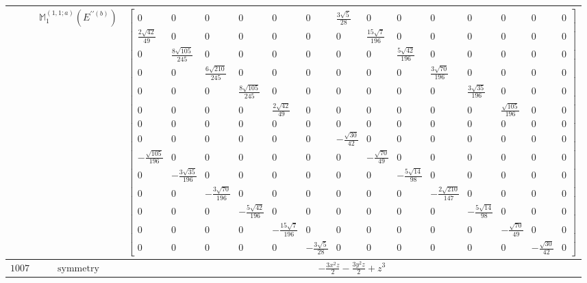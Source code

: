 \documentclass[fleqn,8pt,landscape]{jsarticle}
\begin{document}
\begin{longtable}{ccc}
$  $ & $ \mathbb{M}_{1}^{(1,1;a)}(E^{\prime\prime(b)}) $ & $ \begin{bmatrix} 0 & 0 & 0 & 0 & 0 & 0 & \frac{3 \sqrt{5}}{28} & 0 & 0 & 0 & 0 & 0 & 0 & 0 \\ \frac{2 \sqrt{42}}{49} & 0 & 0 & 0 & 0 & 0 & 0 & \frac{15 \sqrt{7}}{196} & 0 & 0 & 0 & 0 & 0 & 0 \\ 0 & \frac{8 \sqrt{105}}{245} & 0 & 0 & 0 & 0 & 0 & 0 & \frac{5 \sqrt{42}}{196} & 0 & 0 & 0 & 0 & 0 \\ 0 & 0 & \frac{6 \sqrt{210}}{245} & 0 & 0 & 0 & 0 & 0 & 0 & \frac{3 \sqrt{70}}{196} & 0 & 0 & 0 & 0 \\ 0 & 0 & 0 & \frac{8 \sqrt{105}}{245} & 0 & 0 & 0 & 0 & 0 & 0 & \frac{3 \sqrt{35}}{196} & 0 & 0 & 0 \\ 0 & 0 & 0 & 0 & \frac{2 \sqrt{42}}{49} & 0 & 0 & 0 & 0 & 0 & 0 & \frac{\sqrt{105}}{196} & 0 & 0 \\ 0 & 0 & 0 & 0 & 0 & 0 & 0 & 0 & 0 & 0 & 0 & 0 & 0 & 0 \\ 0 & 0 & 0 & 0 & 0 & 0 & - \frac{\sqrt{30}}{42} & 0 & 0 & 0 & 0 & 0 & 0 & 0 \\ - \frac{\sqrt{105}}{196} & 0 & 0 & 0 & 0 & 0 & 0 & - \frac{\sqrt{70}}{49} & 0 & 0 & 0 & 0 & 0 & 0 \\ 0 & - \frac{3 \sqrt{35}}{196} & 0 & 0 & 0 & 0 & 0 & 0 & - \frac{5 \sqrt{14}}{98} & 0 & 0 & 0 & 0 & 0 \\ 0 & 0 & - \frac{3 \sqrt{70}}{196} & 0 & 0 & 0 & 0 & 0 & 0 & - \frac{2 \sqrt{210}}{147} & 0 & 0 & 0 & 0 \\ 0 & 0 & 0 & - \frac{5 \sqrt{42}}{196} & 0 & 0 & 0 & 0 & 0 & 0 & - \frac{5 \sqrt{14}}{98} & 0 & 0 & 0 \\ 0 & 0 & 0 & 0 & - \frac{15 \sqrt{7}}{196} & 0 & 0 & 0 & 0 & 0 & 0 & - \frac{\sqrt{70}}{49} & 0 & 0 \\ 0 & 0 & 0 & 0 & 0 & - \frac{3 \sqrt{5}}{28} & 0 & 0 & 0 & 0 & 0 & 0 & - \frac{\sqrt{30}}{42} & 0 \end{bmatrix} $ \\ \hline
$ 1007 $ & $ \text{symmetry} $ & $ - \frac{3 x^{2} z}{2} - \frac{3 y^{2} z}{2} + z^{3} $ \\

\end{longtable}
\end{document}

